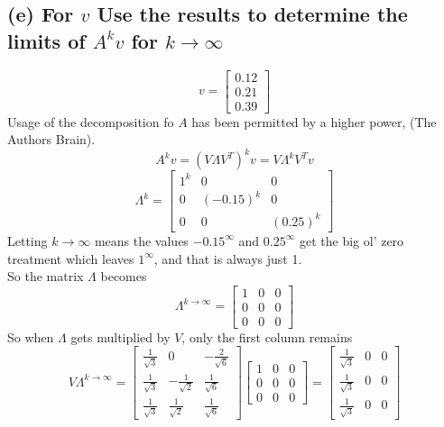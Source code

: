 \documentclass[12pt]{article}
\begin{document}
\subsection*{(e) For $v$ Use the results to determine the limits of $A^k v$ for $ k \to \infty$}
\begin{equation}
    v = \begin{bmatrix}
        0.12 \\
        0.21 \\
        0.39
    \end{bmatrix}
\end{equation}
Usage of the decomposition fo $A$ has been permitted by a higher power, (The Authors Brain).
\begin{equation*}
    A^k v = (V \Lambda V^T)^k v = V \Lambda^k V^T v
\end{equation*}
\begin{equation*}
    \Lambda^k = \begin{bmatrix}
        1^k & 0 & 0 \\
        0 & (-0.15)^k & 0 \\
        0 & 0 & (0.25)^k
    \end{bmatrix}
\end{equation*}
Letting $k \to \infty$ means the values $-0.15^\infty$ and $0.25^\infty$ get the big ol' zero treatment which leaves $1^\infty$,
 and that is always just 1.\\
 So the matrix $\Lambda$ becomes
 \begin{equation*}
    \Lambda^{k \to \infty} = \begin{bmatrix}
        1 & 0 & 0 \\
        0 & 0 & 0 \\
        0 & 0 & 0
    \end{bmatrix}
 \end{equation*}
So when $\Lambda$ gets multiplied by $V$, only the first column remains
\begin{equation*}
    V \Lambda^{k \to \infty} = \begin{bmatrix}
        \frac{1}{\sqrt{3}} & 0 & -\frac{2}{\sqrt{6}} \\
        \frac{1}{\sqrt{3}} & -\frac{1}{\sqrt{2}} & \frac{1}{\sqrt{6}} \\
        \frac{1}{\sqrt{3}} & \frac{1}{\sqrt{2}} & \frac{1}{\sqrt{6}}
    \end{bmatrix} 
    \begin{bmatrix}
        1 & 0 & 0 \\
        0 & 0 & 0 \\
        0 & 0 & 0
    \end{bmatrix} = 
    \begin{bmatrix}
        \frac{1}{\sqrt{3}} & 0 & 0 \\
        \frac{1}{\sqrt{3}} & 0 & 0 \\
        \frac{1}{\sqrt{3}} & 0 & 0
    \end{bmatrix}
\end{equation*}
\end{document}
